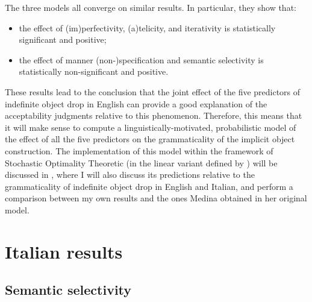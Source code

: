The three models all converge on similar results. In particular, they show that:
\begin{itemize}
    \item the effect of (im)perfectivity, (a)telicity, and iterativity is statistically significant and positive;
    \item the effect of manner (non-)specification and semantic selectivity is statistically non-significant and positive.
\end{itemize}
These results lead to the conclusion that the joint effect of the five predictors of indefinite object drop in English can provide a good explanation of the acceptability judgments relative to this phenomenon. Therefore, this means that it will make sense to compute a linguistically-motivated, probabilistic model of the effect of all the five predictors on the grammaticality of the implicit object construction. The implementation of this model within the framework of Stochastic Optimality Theoretic (in the linear variant defined by \textcite{Medina2007}) will be discussed in , where I will also discuss its predictions relative to the grammaticality of indefinite object drop in English and Italian, and perform a comparison between my own results and the ones Medina obtained in her original model.


\section{Italian results} 

\subsection{Semantic selectivity} 

